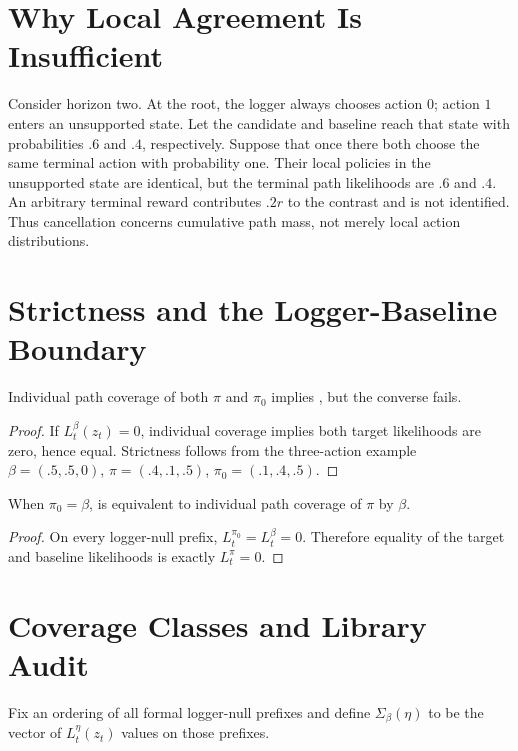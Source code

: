 \section{Why Local Agreement Is Insufficient}

Consider horizon two. At the root, the logger always chooses action $0$; action $1$ enters an unsupported state. Let the candidate and baseline reach that state with probabilities $.6$ and $.4$, respectively. Suppose that once there both choose the same terminal action with probability one. Their local policies in the unsupported state are identical, but the terminal path likelihoods are $.6$ and $.4$. An arbitrary terminal reward contributes $.2r$ to the contrast and is not identified. Thus cancellation concerns cumulative path mass, not merely local action distributions.

\section{Strictness and the Logger-Baseline Boundary}

\begin{proposition}
Individual path coverage of both $\pi$ and $\pi_0$ implies \UCC, but the converse fails.
\end{proposition}
\begin{proof}
If $L_t^\beta(z_t)=0$, individual coverage implies both target likelihoods are zero, hence equal. Strictness follows from the three-action example
$\beta=(.5,.5,0)$,
$\pi=(.4,.1,.5)$,
$\pi_0=(.1,.4,.5)$.
\end{proof}

\begin{proposition}
When $\pi_0=\beta$, \UCC is equivalent to individual path coverage of $\pi$ by $\beta$.
\end{proposition}
\begin{proof}
On every logger-null prefix, $L_t^{\pi_0}=L_t^\beta=0$. Therefore equality of the target and baseline likelihoods is exactly $L_t^\pi=0$.
\end{proof}

\section{Coverage Classes and Library Audit}

Fix an ordering of all formal logger-null prefixes and define
$\Sigma_\beta(\eta)$ to be the vector of $L_t^\eta(z_t)$ values on those prefixes.

